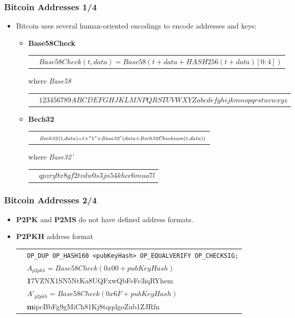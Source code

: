 \documentclass{beamer}
\begin{document}
\begin{frame}
  \frametitle{Bitcoin Addresses 1/4}
  \begin{itemize}
  \item Bitcoin uses several human-oriented encodings to encode addresses and
    keys:
    \begin{itemize}
    \item \textbf{Base58Check}
      \break
      \begin{tabular}{rl}
        &${\scriptstyle \mathit{Base58Check}(t, data) = \mathit{Base58}(t + data + \mathit{HASH256}(t + data)[0:4])}$ \\
      \end{tabular}
      \break
      where \textit{Base58}
      \break
      \begin{tabular}{rl}
        &${\scriptstyle 123456789ABCDEFGHJKLMNPQRSTUVWXYZabcdefghijkmnopqrstuvwxyz}$ \\
      \end{tabular}
    \item \textbf{Bech32}
      \break
      \begin{tabular}{rl}
        &${\scriptstyle \mathit{Bech32}(t, data) = t + "1" + \mathit{Base32'}(data +
          \mathit{Bech32Checksum}(t, data))}$ \\
      \end{tabular}
      where \textit{Base32'}
      \break
      \begin{tabular}{rl}
        &${\scriptstyle qpzry9x8gf2tvdw0s3jn54khce6mua7l}$ \\
      \end{tabular}
    \end{itemize}
  \end{itemize}
\end{frame}

\begin{frame}
  \frametitle{Bitcoin Addresses 2/4}
  \begin{itemize}
  \item \textbf{P2PK} and \textbf{P2MS} do not have defined address formats.
  \item \textbf{P2PKH} address format
    \break
    \begin{tabular}{rl}
      &\tiny\texttt{OP_DUP OP_HASH160 <pubKeyHash>
        OP_EQUALVERIFY OP_CHECKSIG;} \\
      &${\scriptstyle A_{\mathit{p2pkh}} = \mathit{Base58Check}(0x00 +
        pubKeyHash)}$ \\
      &{\scriptsize \quad\quad\quad \textbf{1}7VZNX1SN5NtKa8UQFxwQbFeFc3iqRYhem} \\
      &${\scriptstyle A'_{\mathit{p2pkh}} = \mathit{Base58Check}(0x6F +
        pubKeyHash)}$ \\
      &{\scriptsize \quad\quad\quad \textbf{m}ipcBbFg9gMiCh81Kj8tqqdgoZub1ZJRfn} \\
    \end{tabular}
  \end{itemize}
\end{frame}
\end{document}

